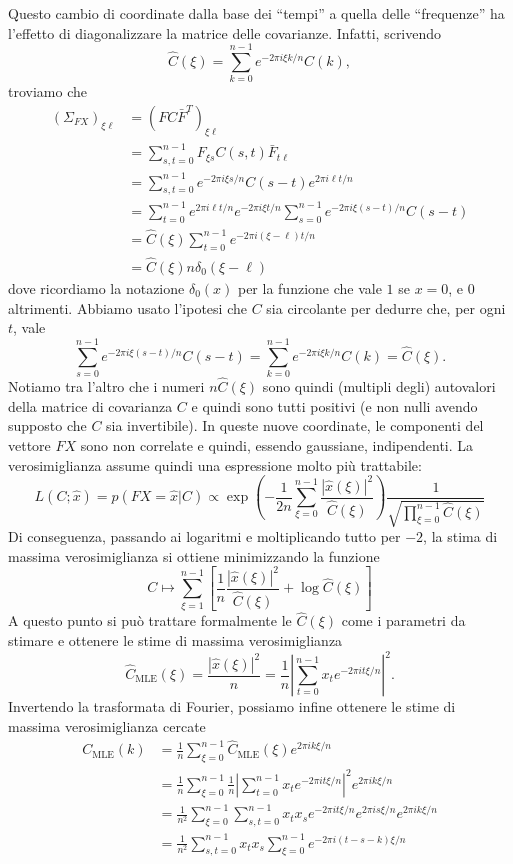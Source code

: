 \documentclass[
  italian,
  letterpaper,
]{book}
\newcommand{\bra}[1]{\left( #1 \right)}
\newcommand{\sqa}[1]{\left[ #1 \right]}
\newcommand{\abs}[1]{\left| #1 \right|}
\newcommand{\mle}{\operatorname{MLE}}
\theoremstyle{definition}
\theoremstyle{remark}
\begin{document}
Questo cambio di coordinate dalla base dei ``tempi'' a quella delle
``frequenze'' ha l'effetto di diagonalizzare la matrice delle
covarianze. Infatti, scrivendo
\[ \hat{C}(\xi) = \sum_{k=0}^{n-1} e^{-2 \pi i \xi k/n} C(k),\] troviamo
che
\[ \begin{split} (\Sigma_{FX})_{\xi \ell} &= ( F C \bar{F}^T)_{\xi \ell} \\
& =\sum_{s,t=0}^{n-1} F_{\xi s } C(s,t) \bar{F}_{t \ell}\\
& =\sum_{s,t=0}^{n-1} e^{-2\pi i \xi s/n} C(s-t)e^{2\pi i \ell t/n}\\ 
& = \sum_{t=0}^{n-1}  e^{2\pi i \ell t/n} e^{-2\pi i \xi t/ n} \sum_{s=0}^{n-1} e^{-2\pi i \xi (s-t)/n} C(s-t)\\
& = \hat{C}(\xi) \sum_{t=0}^{n-1} e^{-2\pi i (\xi-\ell)t/n} \\
& = \hat{C}(\xi) n \delta_0(\xi-\ell) 
\end{split}
\] dove ricordiamo la notazione \(\delta_0(x)\) per la funzione che vale
\(1\) se \(x=0\), e \(0\) altrimenti. Abbiamo usato l'ipotesi che \(C\)
sia circolante per dedurre che, per ogni \(t\), vale
\[  \sum_{s=0}^{n-1} e^{-2\pi i \xi (s-t)/n} C(s-t) = \sum_{k=0}^{n-1} e^{-2\pi i \xi k/n} C(k) = \hat{C}(\xi).\]
Notiamo tra l'altro che i numeri \(n \hat{C}(\xi)\) sono quindi
(multipli degli) autovalori della matrice di covarianza \(C\) e quindi
sono tutti positivi (e non nulli avendo supposto che \(C\) sia
invertibile). In queste nuove coordinate, le componenti del vettore
\(FX\) sono non correlate e quindi, essendo gaussiane, indipendenti. La
verosimiglianza assume quindi una espressione molto più trattabile:
\[ L(   C; \hat x) = p( FX = \hat x |    C ) \propto \exp\bra{ - \frac 1 {2n} \sum_{\xi=0}^{n-1} \frac{| \hat x (\xi)|^2 }{\hat C(\xi)} } \frac{1}{\sqrt{\prod_{\xi=0}^{n-1} \hat C(\xi)}}
\] Di conseguenza, passando ai logaritmi e moltiplicando tutto per
\(-2\), la stima di massima verosimiglianza si ottiene minimizzando la
funzione
\[ C \mapsto  \sum_{\xi=1}^{n-1} \sqa{ \frac 1 n\frac{ | \hat x(\xi)|^2}{\hat{C}(\xi)} + \log \hat{C}(\xi)}\]
A questo punto si può trattare formalmente le \(\hat{C}(\xi)\) come i
parametri da stimare e ottenere le stime di massima verosimiglianza
\[ \hat{C}_{\mle} (\xi) = \frac{ \abs{ \hat x(\xi)}^2}{n} = \frac{1} n \abs{ \sum_{t=0}^{n-1} x_t e^{-2\pi i t \xi /n}}^2.\]
Invertendo la trasformata di Fourier, possiamo infine ottenere le stime
di massima verosimiglianza cercate
\[\begin{split} C_{\mle} (k) & = \frac 1 n \sum_{\xi=0}^{n-1} \hat{C}_{\mle}(\xi) e^{2 \pi i k \xi/n} \\
& =\frac 1 n \sum_{\xi = 0}^{n-1} \frac 1 n \abs{ \sum_{t=0}^{n-1} x_t e^{-2\pi i t \xi/n}}^2 e^{2 \pi i k \xi/n}\\
& = \frac 1 {n^2} \sum_{\xi=0}^{n-1} \sum_{s,t=0}^{n-1} x_t x_s e^{-2\pi i t \xi/n}e^{2\pi i s \xi/n} e^{2 \pi i k \xi/n}\\
& = \frac 1 {n^2} \sum_{s,t=0}^{n-1} x_t x_s \sum_{\xi=0}^{n-1} e^{-2 \pi i (t-s-k)\xi/n}\end{split}\]
\end{document}

